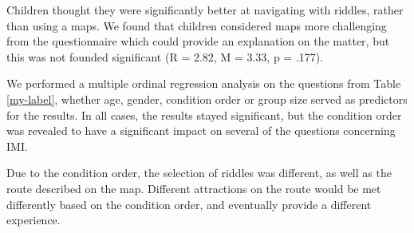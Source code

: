 Children thought they were significantly better at navigating with riddles, rather than using a maps. We found that children considered maps more challenging from the questionnaire which could provide an explanation on the matter, but this was not founded significant (R = 2.82, M = 3.33, p = .177).
 
We performed a multiple ordinal regression analysis on the questions from Table \ref{my-label}, whether age, gender, condition order or group size served as predictors for the results. In all cases, the results stayed significant, but the condition order was revealed to have a significant impact on several of the questions concerning IMI. 

Due to the condition order, the selection of riddles was different, as well as the route described on the map. Different attractions on the route would be met differently based on the condition order, and eventually provide a different experience. 

